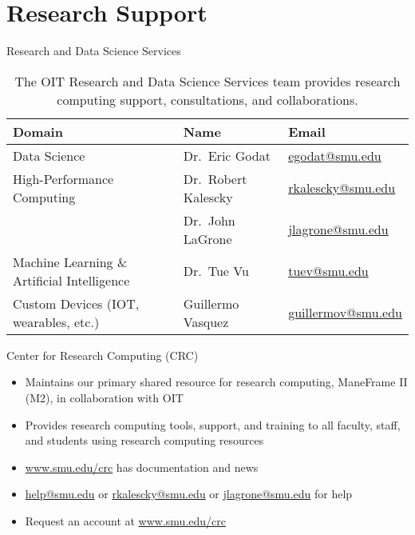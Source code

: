 \section{Research Support}

\begin{frame}{Research and Data Science Services}
\begin{table}
\small
\begin{tabularx}{\textwidth}{Xll}
\toprule
Domain & Name & Email \\
\midrule
Data Science & Dr.\ Eric Godat & \href{mailto:egodat@smu.edu}{egodat@smu.edu} \\
High-Performance Computing & Dr.\ Robert Kalescky & \href{mailto:rkalescky@smu.edu}{rkalescky@smu.edu} \\
& Dr.\ John LaGrone & \href{mailto:jlagrone@smu.edu}{jlagrone@smu.edu} \\
Machine Learning \& Artificial Intelligence & Dr.\ Tue Vu & \href{mailto:tuev@smu.edu}{tuev@smu.edu} \\
Custom Devices (IOT, wearables, etc.) & Guillermo Vasquez & \href{mailto:guillermov@smu.edu}{guillermov@smu.edu} \\
\bottomrule
\end{tabularx}
\caption{The OIT Research and Data Science Services team provides research computing support, consultations, and collaborations.}
\end{table}
\end{frame}

\begin{frame}{Center for Research Computing (CRC)}
\begin{itemize}
  \item Maintains our primary shared resource for research computing, ManeFrame II (M2), in collaboration with OIT
  \item Provides research computing tools, support, and training to all faculty, staff, and students using research computing resources
  \item \url{www.smu.edu/crc} has documentation and news
  \item \href{mailto:help@smu.edu}{help@smu.edu} or \href{mailto:rkalescky@smu.edu}{rkalescky@smu.edu} or \href{mailto:jlagrone@smu.edu}{jlagrone@smu.edu} for help
  \item Request an account at \url{www.smu.edu/crc}
\end{itemize}
\end{frame}

